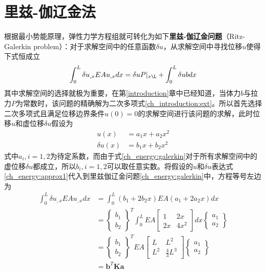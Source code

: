 \section{里兹-伽辽金法}
根据最小势能原理，弹性力学方程组就可转化为如下\textbf{里兹-伽辽金问题}（Ritz-Galerkin problem）：对于求解空间中的任意函数$\delta u$，从求解空间中寻找位移$u$使得下式恒成立
\begin{equation}\label{ch_energy:galerkin}
    \int_0^L \delta u_{,x} EA u_{,x} dx = \delta uP\vert_{x\L} + \int_0^L \delta ub dx
\end{equation}
其中求解空间的选择就极为重要，在第\ref{introduction}章中已经知道，当体力$b$与拉力$P$为常数时，该问题的精确解为二次多项式\eqref{ch_introduction:ext}。所以首先选择二次多项式且满足位移边界条件$u(0)=0$的求解空间进行该问题的求解，此时位移$u$和虚位移$\delta u$假设为
\begin{subequations}\label{ch_energy:approx1}
\begin{align}
    u(x) &= a_1 x + a_2 x^2 \\
    \delta u(x) &= b_1 x + b_2 x^2
\end{align}
\end{subequations}
式中$a_i,i=1,2$为待定系数，而由于式\eqref{ch_energy:galerkin}对于所有求解空间中的虚位移$\delta u$都成立，所以$b_i,i=1,2$可以取任意实数。将假设的$u$和$\delta u$表达式\eqref{ch_energy:approx1}代入到里兹伽辽金问题\eqref{ch_energy:galerkin}中，方程等号左边为
\begin{equation}
\begin{split}
    \int_0^L \delta u_{,x} EA u_{,x} dx &= \int_0^L (b_1 + 2b_2 x)EA(a_1 + 2a_2 x) dx \\
    &= \begin{Bmatrix}
        b_1 \\ b_2
       \end{Bmatrix}^T
       \int_0^L EA \begin{bmatrix}
       1 & 2x \\ 2x & 4x^2 
       \end{bmatrix} dx
       \begin{Bmatrix}
        a_1 \\ a_2
       \end{Bmatrix} \\
    &= \begin{Bmatrix}
        b_1 \\ b_2
       \end{Bmatrix}^T
       EA\begin{bmatrix}
       L & L^2 \\ L^2 & \frac{4}{3}L^3 
       \end{bmatrix}
       \begin{Bmatrix}
        a_1 \\ a_2
       \end{Bmatrix} \\
    &= \boldsymbol b^T \boldsymbol K \boldsymbol a
\end{split}
\end{equation}
